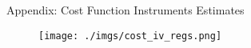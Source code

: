 \documentclass[notes,11pt, aspectratio=169]{beamer}
\begin{document}
      \begin{frame}[label=costiv]{Appendix: Cost Function Instruments Estimates \hyperlink{cost}{}}
        \vspace{0.5cm}
          
            \begin{figure}[t*]
              \centering
        
              \texttt{[image: ./imgs/cost\_iv\_regs.png]}
            \end{figure}
            
          \end{frame}



\end{document}
